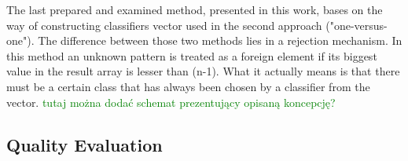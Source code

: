 \documentclass{llncs}
\begin{document}
The last prepared and examined method, presented in this work, bases on the way of constructing classifiers vector used in the second approach ("one-versus-one"). The difference between those two methods lies in a rejection mechanism. In this method an unknown pattern is treated as a foreign element if its biggest value in the result array is lesser than (n-1). What it actually means is that there must be a certain class that has always been chosen by a classifier from the vector. \textcolor{green}{tutaj można dodać schemat prezentujący opisaną koncepcję?} \\




\subsection{Quality Evaluation}
\end{document}
